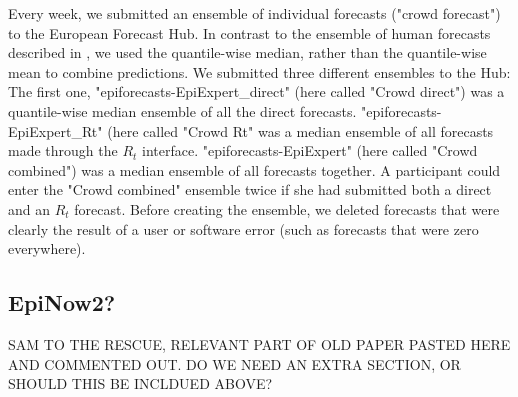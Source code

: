 \documentclass[10pt,a4paper,twocolumn]{article}
\begin{document}
Every week, we submitted an ensemble of individual forecasts ("crowd forecast") to the European Forecast Hub. In contrast to the ensemble of human forecasts described in \citet{bosseComparingHumanModelbased2022}, we used the quantile-wise median, rather than the quantile-wise mean to combine predictions. %
We submitted three different ensembles to the Hub: The first one, "epiforecasts-EpiExpert\_direct" (here called "Crowd direct") was a quantile-wise median ensemble of all the direct forecasts. "epiforecasts-EpiExpert\_Rt" (here called "Crowd Rt" was a median ensemble of all forecasts made through the $R_t$ interface. "epiforecasts-EpiExpert" (here called "Crowd combined") was a median ensemble of all forecasts together. A participant could enter the "Crowd combined" ensemble twice if she had submitted both a direct and an $R_t$ forecast. Before creating the ensemble, we deleted forecasts that were clearly the result of a user or software error (such as forecasts that were zero everywhere).

\subsection*{EpiNow2?}

SAM TO THE RESCUE, RELEVANT PART OF OLD PAPER PASTED HERE AND COMMENTED OUT. DO WE NEED AN EXTRA SECTION, OR SHOULD THIS BE INCLDUED ABOVE? 

% 
\end{document}
